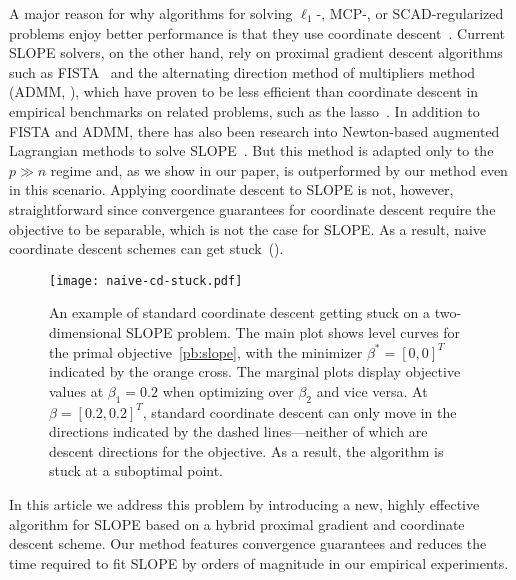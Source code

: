 A major reason for why algorithms for solving
$\ell_1$-, MCP-, or SCAD-regularized problems enjoy better performance is that
they use coordinate
descent~\parencite{tseng2001convergence,friedman2010,breheny2011}. Current SLOPE
solvers, on the other hand, rely on proximal gradient descent algorithms such
as FISTA~\parencite{beck2009} and the alternating direction method of multipliers
method (ADMM, \cite{boyd2010}), which have proven to be less efficient than
coordinate descent in empirical benchmarks on related problems, such as the
lasso~\parencite{moreau2022benchopt}.
In addition to FISTA and ADMM, there has also been research into Newton-based augmented Lagrangian methods to solve SLOPE~\parencite{Ziyan2019}.
But this method is adapted only to the \(p \gg n\) regime and, as we show in our paper, is outperformed by our method even in this scenario.
Applying coordinate descent to SLOPE is not,
however, straightforward since convergence guarantees for coordinate descent
require the objective to be separable, which is not the case for SLOPE. As a
result, naive coordinate descent schemes can get
stuck~().

\begin{figure}[htb]
  \centering
  \texttt{[image: naive-cd-stuck.pdf]}
  \caption{%
    An example of standard coordinate descent getting stuck on a two-dimensional SLOPE problem.
    The main plot shows level curves for the primal objective~\eqref{pb:slope}, with the minimizer \(\beta^* = [0, 0]^T\) indicated by the orange cross.
    The marginal plots display objective values at \(\beta_1 = 0.2\) when optimizing over \(\beta_2\) and vice versa.
    At \(\beta = [0.2,0.2]^T\), standard coordinate descent can only move in the directions indicated by the dashed lines---neither of which are descent directions for the objective.
    As a result, the algorithm is stuck at a suboptimal point.
  }
  \label{fig:naive-cd-stuck}
\end{figure}

In this article we address this problem by introducing a new, highly effective
algorithm for SLOPE based on a hybrid proximal gradient and coordinate descent
scheme. Our method features convergence guarantees and reduces the time
required to fit SLOPE by orders of magnitude in our empirical experiments.



